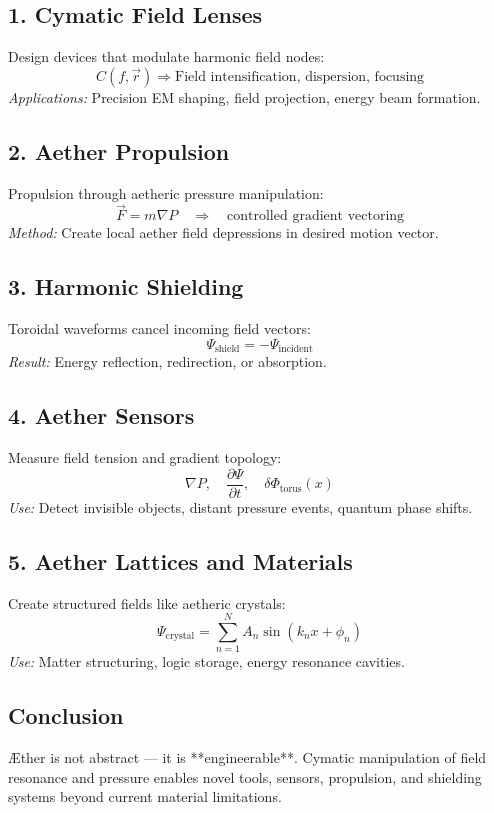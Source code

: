 \documentclass[12pt]{book}
\begin{document}
\subsection*{1. Cymatic Field Lenses}
Design devices that modulate harmonic field nodes:
\[
C(f, \vec{r}) \Rightarrow \text{Field intensification, dispersion, focusing}
\]
\textit{Applications:} Precision EM shaping, field projection, energy beam formation.

\subsection*{2. Aether Propulsion}
Propulsion through aetheric pressure manipulation:
\[
\vec{F} = m \nabla P \quad \Rightarrow \quad \text{controlled gradient vectoring}
\]
\textit{Method:} Create local aether field depressions in desired motion vector.

\subsection*{3. Harmonic Shielding}
Toroidal waveforms cancel incoming field vectors:
\[
\Psi_{\text{shield}} = -\Psi_{\text{incident}}
\]
\textit{Result:} Energy reflection, redirection, or absorption.

\subsection*{4. Aether Sensors}
Measure field tension and gradient topology:
\[
\nabla P, \quad \frac{\partial \Psi}{\partial t}, \quad \delta \Phi_{\text{torus}}(x)
\]
\textit{Use:} Detect invisible objects, distant pressure events, quantum phase shifts.

\subsection*{5. Aether Lattices and Materials}
Create structured fields like aetheric crystals:
\[
\Psi_{\text{crystal}} = \sum_{n=1}^N A_n \sin(k_n x + \phi_n)
\]
\textit{Use:} Matter structuring, logic storage, energy resonance cavities.

\subsection*{Conclusion}
Æther is not abstract — it is **engineerable**. Cymatic manipulation of field resonance and pressure enables novel tools, sensors, propulsion, and shielding systems beyond current material limitations.
\end{document}
